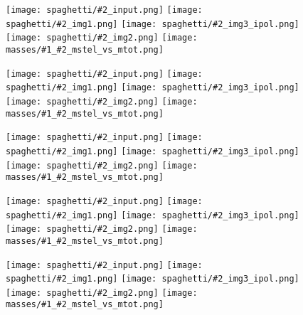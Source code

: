 \documentclass[a4paper,fleqn,usenatbib]{mnras}
\newcommand{\inclfig}[2]{
  \texttt{[image: spaghetti/\#2\_input.png]}
  \texttt{[image: spaghetti/\#2\_img1.png]}
  \texttt{[image: spaghetti/\#2\_img3\_ipol.png]}
  \texttt{[image: spaghetti/\#2\_img2.png]}
  \texttt{[image: masses/\#1\_\#2\_mstel\_vs\_mtot.png]}
}
\begin{document}
\begin{figure}
	\inclfig{SW02}{ASW000619d_011489}
\end{figure}

\begin{figure}
	\inclfig{SW05}{ASW0007k4r_AJIBCHQ6EM}
\end{figure}

\begin{figure}
	\inclfig{SW09}{ASW0002asp_5EKMWWVJHL}
\end{figure}

\begin{figure}
	\inclfig{SW28}{ASW0007xrs_JHC3J2HYV7}
\end{figure}

\begin{figure}
	\inclfig{SW29}{ASW0008qsm_TOFS7JNGEK}
\end{figure}
\end{document}
